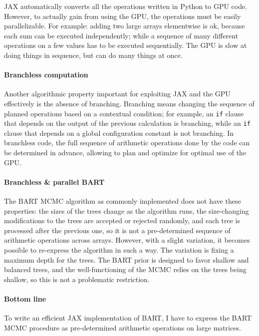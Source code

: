 \documentclass{article}
\begin{document}
    JAX automatically converts all the operations written in Python to GPU code. However, to actually gain from using the GPU, the operations must be easily parallelizable. For example: adding two large arrays elementwise is ok, because each sum can be executed independently; while a sequence of many different operations on a few values has to be executed sequentially. The GPU is slow at doing things in sequence, but can do many things at once.

    \paragraph{Branchless computation}

    Another algorithmic property important for exploiting JAX and the GPU effectively is the absence of branching. Branching means changing the sequence of planned operations based on a contextual condition; for example, an \texttt{if} clause that depends on the output of the previous calculation is branching, while an \texttt{if} clause that depends on a global configuration constant is not branching. In branchless code, the full sequence of arithmetic operations done by the code can be determined in advance, allowing to plan and optimize for optimal use of the GPU.

    \paragraph{Branchless \& parallel BART}

    The BART MCMC algorithm as commonly implemented does not have these properties: the sizes of the trees change as the algorithm runs, the size-changing modifications to the trees are accepted or rejected randomly, and each tree is processed after the previous one, so it is not a pre-determined sequence of arithmetic operations across arrays. However, with a slight variation, it becomes possible to re-express the algorithm in such a way. The variation is fixing a maximum depth for the trees. The BART prior is designed to favor shallow and balanced trees, and the well-functioning of the MCMC relies on the trees being shallow, so this is not a problematic restriction.

    \paragraph{Bottom line}

    To write an efficient JAX implementation of BART, I have to express the BART MCMC procedure as pre-determined arithmetic operations on large matrices.
\end{document}
